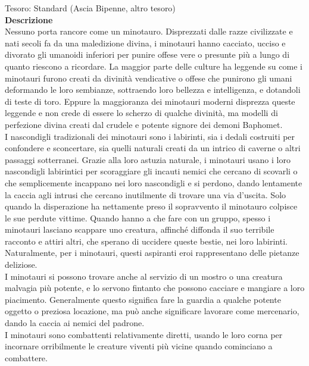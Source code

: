 \begin{multicols}{2}
Tesoro: Standard (Ascia Bipenne, altro tesoro)\\
\textbf{Descrizione}\\
Nessuno porta rancore come un minotauro. Disprezzati dalle razze civilizzate e nati secoli fa da una maledizione divina, i minotauri hanno cacciato, ucciso e divorato gli umanoidi inferiori per punire offese vere o presunte più a lungo di quanto riescono a ricordare. La maggior parte delle culture ha leggende su come i minotauri furono creati da divinità vendicative o offese che punirono gli umani deformando le loro sembianze, sottraendo loro bellezza e intelligenza, e dotandoli di teste di toro. Eppure la maggioranza dei minotauri moderni disprezza queste leggende e non crede di essere lo scherzo di qualche divinità, ma modelli di perfezione divina creati dal crudele e potente signore dei demoni Baphomet.\\
I nascondigli tradizionali dei minotauri sono i labirinti, sia i dedali costruiti per confondere e sconcertare, sia quelli naturali creati da un intrico di caverne o altri passaggi sotterranei. Grazie alla loro astuzia naturale, i minotauri usano i loro nascondigli labirintici per scoraggiare gli incauti nemici che cercano di scovarli o che semplicemente incappano nei loro nascondigli e si perdono, dando lentamente la caccia agli intrusi che cercano inutilmente di trovare una via d’uscita. Solo quando la disperazione ha nettamente preso il sopravvento il minotauro colpisce le sue perdute vittime. Quando hanno a che fare con un gruppo, spesso i minotauri lasciano scappare uno creatura, affinché diffonda il suo terribile racconto e attiri altri, che sperano di uccidere queste bestie, nei loro labirinti. Naturalmente, per i minotauri, questi aspiranti eroi rappresentano delle pietanze deliziose.\\
I minotauri si possono trovare anche al servizio di un mostro o una creatura malvagia più potente, e lo servono fintanto che possono cacciare e mangiare a loro piacimento. Generalmente questo significa fare la guardia a qualche potente oggetto o preziosa locazione, ma può anche significare lavorare come mercenario, dando la caccia ai nemici del padrone.\\
I minotauri sono combattenti relativamente diretti, usando le loro corna per incornare orribilmente le creature viventi più vicine quando cominciano a combattere.\\


\end{multicols}
